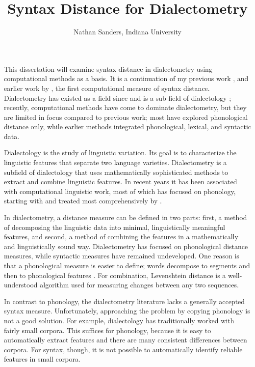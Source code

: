 \documentclass[11pt,letterpaper]{article}
\author{Nathan Sanders, Indiana University}
\title{Syntax Distance for Dialectometry}
\begin{document}
\maketitle

This dissertation will examine syntax distance in dialectometry using
computational methods as a basis. It is a continuation of my previous
work \cite{sanders07}, \cite{sanders08b} and earlier work by
, the first computational measure of syntax
distance. Dialectometry has existed as a field since
 and is a sub-field of dialectology
\cite{chambers98}; recently, computational methods have come to
dominate dialectometry, but they are limited in focus compared to
previous work; most have explored phonological distance only, while
earlier methods integrated phonological, lexical, and syntactic data.

Dialectology is the study of linguistic variation.
Its goal is to characterize the linguistic features that separate two
language varieties. Dialectometry is a subfield of dialectology that
uses mathematically sophisticated methods to extract and combine
linguistic features. In recent years it has been associated with
computational linguistic work, most of which has focused on
phonology, starting with  and treated most
comprehensively by .

In dialectometry, a distance measure can be defined in two parts:
first, a method of decomposing the linguistic data into minimal,
linguistically meaningful features, and second, a method of combining
the features in a mathematically and linguistically sound way.
Dialectometry has focused on phonological distance measures, while
syntactic measures have remained undeveloped. One reason is that a
phonological measure is easier to define; words decompose to segments
and then to phonological features \cite{chomsky68}. For combination, Levenshtein
distance \cite{lev65} is a well-understood algorithm used for
measuring changes between any two sequences.

In contrast to phonology, the dialectometry literature lacks a
generally accepted syntax measure. Unfortunately, approaching the
problem by copying phonology is not a good solution.  For example,
dialectology has traditionally worked with fairly small corpora. This
suffices for phonology, because it is easy to automatically extract features
and there are many consistent differences between corpora. For syntax,
though, it is not possible to automatically identify reliable features in small corpora.
\end{document}
